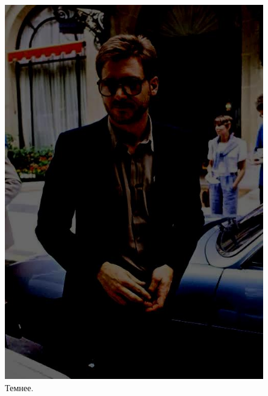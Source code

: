 \documentclass[a4paper,12pt]{article}
\begin{document}
\begin{figure}[h]
\begin{minipage}[h]{0.2\linewidth}
\includegraphics[width=1\linewidth]{Pic_Dark}
Темнее.
\end{minipage}

\vspace{5mm}


\end{figure}
\end{document}
